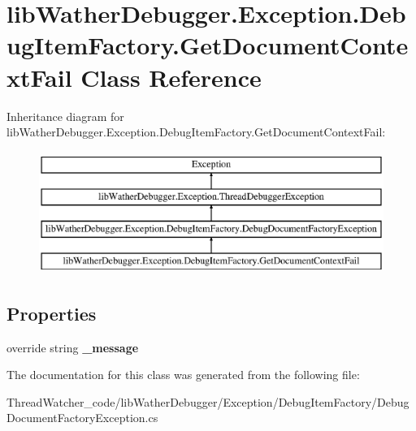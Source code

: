 \hypertarget{classlib_wather_debugger_1_1_exception_1_1_debug_item_factory_1_1_get_document_context_fail}{\section{lib\+Wather\+Debugger.\+Exception.\+Debug\+Item\+Factory.\+Get\+Document\+Context\+Fail Class Reference}
\label{classlib_wather_debugger_1_1_exception_1_1_debug_item_factory_1_1_get_document_context_fail}
}
Inheritance diagram for lib\+Wather\+Debugger.\+Exception.\+Debug\+Item\+Factory.\+Get\+Document\+Context\+Fail\+:\begin{figure}[H]
\begin{center}
\leavevmode
\includegraphics[height=4.000000cm]{classlib_wather_debugger_1_1_exception_1_1_debug_item_factory_1_1_get_document_context_fail}
\end{center}
\end{figure}
\subsection*{Properties}
\begin{DoxyCompactItemize}
\item 
\hypertarget{classlib_wather_debugger_1_1_exception_1_1_debug_item_factory_1_1_get_document_context_fail_aae8ebd060a6b5d555a0916d920202d59}{override string {\bfseries \+\_\+message}}\label{classlib_wather_debugger_1_1_exception_1_1_debug_item_factory_1_1_get_document_context_fail_aae8ebd060a6b5d555a0916d920202d59}

\end{DoxyCompactItemize}


The documentation for this class was generated from the following file\+:\begin{DoxyCompactItemize}
\item 
Thread\+Watcher\+\_\+code/lib\+Wather\+Debugger/\+Exception/\+Debug\+Item\+Factory/Debug\+Document\+Factory\+Exception.\+cs\end{DoxyCompactItemize}
